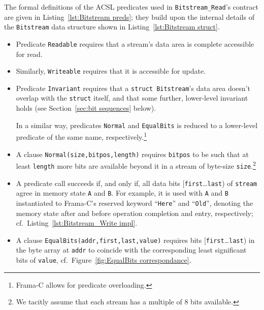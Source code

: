 The formal definitions of the ACSL predicates used
in \lstinline{Bitstream_Read}'s contract are given in
Listing~\ref{lst:Bitstream preds}; they build upon the internal
details of the \lstinline{Bitstream} data structure shown in
Listing~\ref{lst:Bitstream struct}.
%
\begin{itemize}
\item Predicate \lstinline{Readable} requires that a stream's data area is
	complete accessible for read.
\item Similarly, \lstinline{Writeable} requires that it is accessible for
	update.

\item Predicate \lstinline{Invariant} requires that a 
	\lstinline{struct Bitstream}'s data area
	doesn't overlap with the \lstinline{struct} itself, and that some
	further, lower-level invariant holds (see 
	Section~\ref{sec:bit sequences} below).

	In a similar way, predicates \lstinline{Normal} and
	\lstinline{EqualBits} is reduced to a
	lower-level predicate of the same 
	name, 
	respectively.\footnote{Frama-C allows for predicate overloading.}

\item
	A clause \lstinline{Normal(size,bitpos,length)} requires
	\lstinline{bitpos} to be such that at least \lstinline{length}
	more bits are available beyond it in a stream of byte-size
	\lstinline{size}.\footnote{
		We tacitly assume that each stream has a multiple of 8 bits
		available.  
	}

\item
	A predicate call
	 succeeds if,
	and only if, 
	all data bits [\lstinline{first}\ldots\lstinline{last})
	of \lstinline{stream} agree in memory state \lstinline{A} and
	\lstinline{B}.
	For example, it is used with \lstinline{A} and \lstinline{B}
	instantiated to Frama-C's reserved keyword ``\lstinline{Here}'' and
	``\lstinline{Old}'', denoting the memory state after and before
	operation completion and entry, respectively; cf.\
	Listing~\ref{lst:Bitstream_Write impl}.

\item
	A clause \lstinline{EqualBits(addr,first,last,value)} requires 
	bits [\lstinline{first}\ldots\lstinline{last}) in
	the byte array at \lstinline{addr} to coincide with the
	corresponding least significant bits of \lstinline{value},
	cf.~Figure~\ref{fig:EqualBits correspondance}.
\end{itemize}


